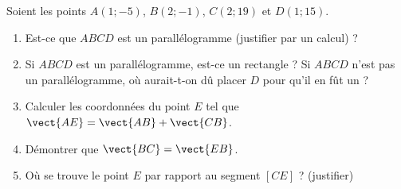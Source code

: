 
\begin{exercice}[\ldots/5]\label{exosmath-0670}

    Soient les points \( A(1;-5)\), \( B(2;-1)\), \( C(2;19)\) et \( D(1;15)\).
    \begin{enumerate}
        \item
            Est-ce que \( ABCD\) est un parallélogramme (justifier par un calcul) ?
        \item
            Si \( ABCD\) est un parallélogramme, est-ce un rectangle ? Si \( ABCD\) n'est pas un parallélogramme, où aurait-t-on dû placer \( D\) pour qu'il en fût un ?
        \item
            Calculer les coordonnées du point \( E\) tel que \( \vect{ AE }=\vect{ AB }+\vect{ CB }\).
        \item
            Démontrer que \( \vect{ BC }=\vect{ EB }\).
        \item
            Où se trouve le point \( E\) par rapport au segment \( [CE]\) ? (justifier)
    \end{enumerate}


\end{exercice}
